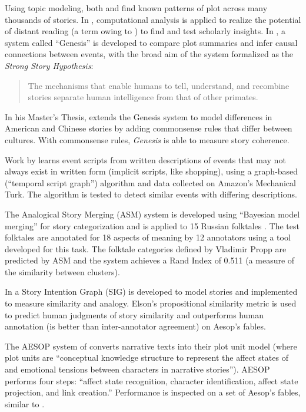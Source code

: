 {Using topic modeling, both \cite{schmidt2015plot} and \cite{jockers2013macroanalysis} find known patterns of plot across many thousands of stories.
In \cite{piper2015novel}, computational analysis is applied to realize the potential of distant reading (a term owing to \cite{moretti2013distant}) to find and test scholarly insights.
In \cite{winston2011strong}, a system called ``Genesis'' is developed to compare plot summaries and infer causal connections between events, with the broad aim of the system formalized as the \textit{Strong Story Hypothesis}:
\begin{quote}
  The mechanisms that enable humans to tell, understand, and recombine stories separate human intelligence from that of other primates.
\end{quote}
In his Master's Thesis, \cite{awad2013culturally} extends the Genesis system to model differences in American and Chinese stories by adding commonsense rules that differ between cultures.
With commonsense rules, \textit{Genesis} is able to measure story coherence.

Work by \cite{regneri2010learning} learns event scripts from written descriptions of events that may not always exist in written form (implicit scripts, like shopping), using a graph-based (``temporal script graph'') algorithm and data collected on Amazon's Mechanical Turk. The algorithm is tested to detect similar events with differing descriptions.

The Analogical Story Merging (ASM) system is developed using ``Bayesian model merging'' for story categorization and is applied to 15 Russian folktales \citep{finlayson2011learning}.
The test folktales are annotated for 18 aspects of meaning by 12 annotators using a tool developed for this task.
The folktale categories defined by Vladimir Propp are predicted by ASM and the system achieves a Rand Index of 0.511 (a measure of the similarity between clusters).

In \cite{elson2012detecting} a Story Intention Graph (SIG) is developed to model stories and implemented to measure similarity and analogy.
Elson's propositional similarity metric is used to predict human judgments of story similarity and outperforms human annotation (is better than inter-annotator agreement) on Aesop's fables.

The AESOP system of \cite{goyal2013computational} converts narrative texts into their plot unit model (where plot units are ``conceptual knowledge structure to represent the affect states of and emotional tensions between characters in narrative stories'').
AESOP performs four steps: ``affect state recognition, character identification, affect state projection, and link creation.''
Performance is inspected on a set of Aesop's fables, similar to \cite{elson2012detecting}.

}

